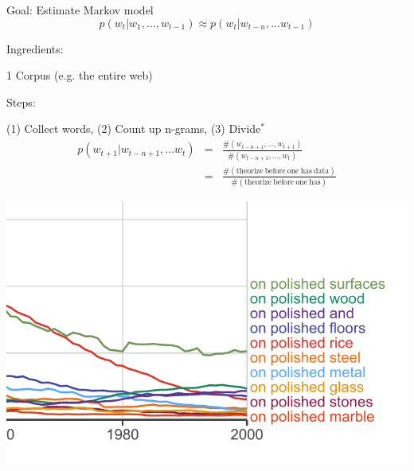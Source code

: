 \documentclass{beamer}
\let\tempone\itemize
\let\temptwo\enditemize
\renewenvironment{itemize}{\tempone\addtolength{\itemsep}{0.5\baselineskip}}{\temptwo}
\begin{document}
\begin{frame}

Goal: Estimate Markov model 
\[ p(w_{t} | w_{1}, \ldots, w_{t-1}) \approx p(w_{t} | w_{t-n}, \ldots w_{t-1})\] 

Ingredients: 

\begin{itemize}
\item 1 Corpus (e.g. the entire web)

\end{itemize}

Steps:

\begin{itemize}
\item (1) Collect words, (2) Count up n-grams, (3) Divide$^*$
  \begin{eqnarray*} 
    p(w_{t+1} | w_{t-n+1}, \ldots w_{t}) &=& \frac{\#( w_{t-n+1}, \ldots, w_{t+1}) }{\#( w_{t-n+1}, \ldots, w_{t})} \\
    &=&  \frac{\#(\mathrm{theorize\ before\ one\ has\ data})}{\#(\mathrm{theorize\ before\ one\ has})}
    \end{eqnarray*}
\end{itemize}
\end{frame}

\begin{frame}
  \begin{center}
    \includegraphics[width=\textwidth]{polished}
  \end{center}
\end{frame}
\end{document}
